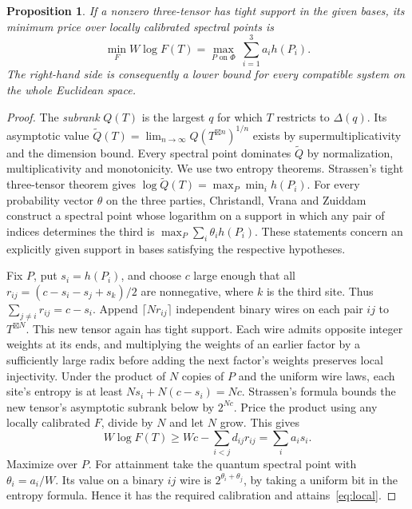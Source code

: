 \documentclass[11pt,letterpaper]{article}
\newtheorem{proposition}[theorem]{Proposition}
\theoremstyle{definition}
\begin{document}
\begin{proposition}\label{prop:local}
If a nonzero three-tensor has tight support in the given bases, its
minimum price over locally calibrated spectral points is
\begin{equation}
 \min_F W\log F(T)=\max_{P\text{ on }\Phi}\ \sum_{i=1}^3 a_i h(P_i).
 \label{eq:local}
\end{equation}
The right-hand side is consequently a lower bound for every compatible
system on the whole Euclidean space.
\end{proposition}
\begin{proof}
The \emph{subrank} \(Q(T)\) is the largest \(q\) for which \(T\)
restricts to \(\Delta(q)\). Its asymptotic value
\(\widetilde Q(T)=\lim_{n\to\infty}Q(T^{\boxtimes n})^{1/n}\)
exists by supermultiplicativity and the dimension bound.
Every spectral point dominates \(\widetilde Q\) by normalization,
multiplicativity and monotonicity. We use two entropy theorems.
Strassen's tight three-tensor theorem gives
\(\log\widetilde Q(T)=\max_P\min_i h(P_i)\).
For every probability vector \(\theta\) on the three parties,
Christandl, Vrana and Zuiddam construct a spectral point whose logarithm
on a support in which any pair of indices determines the third is
\(\max_P\sum_i\theta_i h(P_i)\). These statements concern an explicitly
given support in bases satisfying the respective hypotheses.
\cite{strassen-tight,cvz-universal}

Fix \(P\), put \(s_i=h(P_i)\), and choose \(c\) large enough that all
\(r_{ij}=(c-s_i-s_j+s_k)/2\) are nonnegative, where \(k\) is the third
site. Thus \(\sum_{j\ne i}r_{ij}=c-s_i\). Append
\(\lceil Nr_{ij}\rceil\) independent binary wires on each pair \(ij\)
to \(T^{\boxtimes N}\). This new tensor again has tight support.
Each wire admits opposite integer weights at its ends, and multiplying
the weights of an earlier factor by a sufficiently large radix before
adding the next factor's weights preserves local injectivity. Under the
product of \(N\) copies of \(P\) and the uniform wire laws, each site's
entropy is at least \(Ns_i+N(c-s_i)=Nc\). Strassen's formula bounds
the new tensor's asymptotic subrank below by \(2^{Nc}\). Price the
product using any locally calibrated \(F\), divide by \(N\) and let
\(N\) grow. This gives
\[
 W\log F(T)\ge Wc-\sum_{i<j}d_{ij}r_{ij}
              =\sum_i a_i s_i .
\]
Maximize over \(P\). For attainment take the quantum spectral point with
\(\theta_i=a_i/W\). Its value on a binary \(ij\) wire is
\(2^{\theta_i+\theta_j}\), by taking a uniform bit in the entropy
formula. Hence it has the required calibration and attains~\eqref{eq:local}.
\end{proof}
\end{document}
